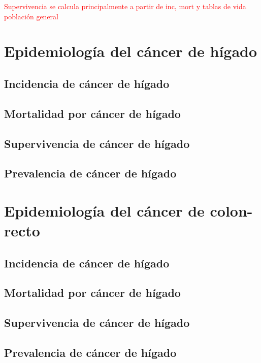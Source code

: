 \textcolor{red}{Supervivencia se calcula principalmente a partir de inc, mort y tablas de vida población general}

\section{Epidemiología del cáncer de hígado}

\subsection{Incidencia de cáncer de hígado}

\subsection{Mortalidad por cáncer de hígado}

\subsection{Supervivencia de cáncer de hígado} 

\subsection{Prevalencia de cáncer de hígado}

\section{Epidemiología del cáncer de colon-recto}

\subsection{Incidencia de cáncer de hígado}

\subsection{Mortalidad por cáncer de hígado}

\subsection{Supervivencia de cáncer de hígado} 

\subsection{Prevalencia de cáncer de hígado}






